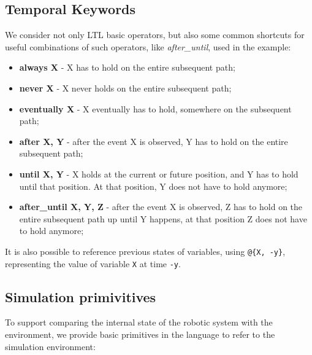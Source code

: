\documentclass[runningheads]{llncs}
\begin{document}
\subsection{Temporal Keywords}

We consider not only LTL basic operators, but also some common shortcuts for useful combinations of such operators, like \textit{after\_until}, used in the example:

\begin{itemize}
\item {\bfseries always X} - X has to hold on the entire subsequent path;
\item {\bfseries never X} - X never holds on the entire subsequent path;
\item {\bfseries eventually X} - X eventually has to hold, somewhere on the subsequent path;
\item {\bfseries after X, Y} - after the event X is observed, Y has to hold on the entire subsequent path;
\item {\bfseries until X, Y} - X holds at the current or future position, and Y has to hold until that position. At that position, Y does not have to hold anymore;
\item {\bfseries after\_until X, Y, Z} - after the event X is observed, Z has to hold on the entire subsequent path up until Y happens, at that position Z does not have to hold anymore;
\end{itemize}

\noindent It is also possible to reference previous states of variables, using \lstinline|@{X, -y}|, representing the value of variable \lstinline|X| at time \lstinline|-y|.

\subsection{Simulation primivitives}

To support comparing the internal state of the robotic system with the environment, we provide basic primitives in the language to refer to the simulation environment:
\end{document}
